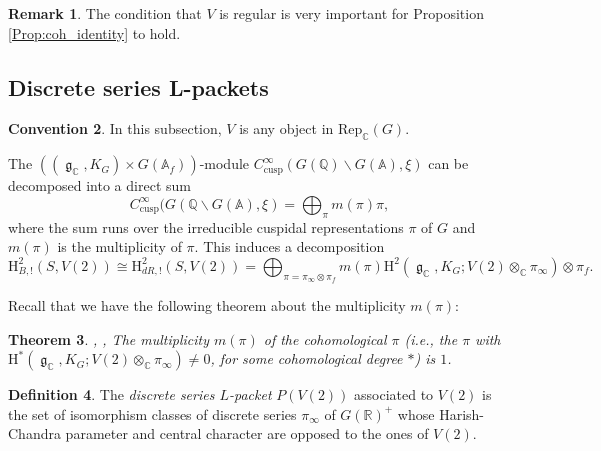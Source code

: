 \documentclass[11pt, a4paper]{amsart}
\theoremstyle{plain}
\newtheorem{theorem}{Theorem}[section]
\theoremstyle{definition}
\newtheorem{definition}[theorem]{Definition}
\newtheorem{remark}[theorem]{Remark}
\newtheorem{convention}[theorem]{Convention}
\numberwithin{equation}{section}
\def\AAA{\mathbb{A}}
\def\CC{\mathbb{C}}
\def\QQ{\mathbb{Q}}
\def\RR{\mathbb{R}}
\DeclareMathOperator{\lieg}{\mathfrak g}
\begin{document}
\begin{remark}
    The condition that $V$ is regular is very important for Proposition \ref{Prop:coh_identity} to hold. 
\end{remark}

\subsection{Discrete series L-packets}
\label{SS:discrete series}

\begin{convention}
    In this subsection, $V$ is any object in $\mathrm{Rep}_{\CC}(G)$. 
\end{convention}

The $((\lieg_{\CC}, K_G) \times G(\AAA_f)) $-module $C_{\text{cusp}}^{\infty}(G(\QQ) \backslash G(\AAA), \xi)$ can be decomposed into a direct sum 
\begin{equation*}
    C_{\text{cusp}}^{\infty}(G(\QQ \backslash G(\AAA), \xi) = \bigoplus_{\pi} m(\pi) \pi,
\end{equation*}
where the sum runs over the irreducible cuspidal representations $\pi$ of $G$ and $m(\pi)$ is the multiplicity of $\pi$. This induces a decomposition 
\begin{equation}
\label{eq: decomosition of Betti into (g,K)-cohomology}
    \mathrm{H}^{2}_{B, !}(S, V(2)) \cong \mathrm{H}^{2}_{dR, !}(S, V(2)) = \bigoplus_{\pi = \pi_{\infty} \otimes \pi_f} m(\pi) \mathrm{H}^{2}(\lieg_{\CC}, K_{G}; V(2) \otimes_{\CC} \pi_{\infty})\otimes \pi_f. 
\end{equation}

Recall that we have the following theorem about the multiplicity $m(\pi)$: 

\begin{theorem} \textnormal{\cite{Mok15}, \cite[\S 1.1]{CHL11}, \cite[Theorem 2.6.3]{LSZ22}}
\label{Thm: multiplicity 1}
    The multiplicity $m(\pi)$ of the cohomological $\pi$ (i.e., the $\pi$ with $\mathrm{H}^{*}(\lieg_{\CC}, K_{G}; V(2) \otimes_{\CC} \pi_{\infty}) \neq 0$, 
    for some cohomological degree $*$) is $1$. 
\end{theorem}

\begin{definition}
    The \textit{discrete series $L$-packet} $P(V(2))$ associated to $V(2)$ is the set of isomorphism classes of discrete series $\pi_{\infty}$ of $G(\RR)^{+}$ whose Harish-Chandra parameter and central character are opposed to the ones of $V(2)$. 
\end{definition}
\end{document}
